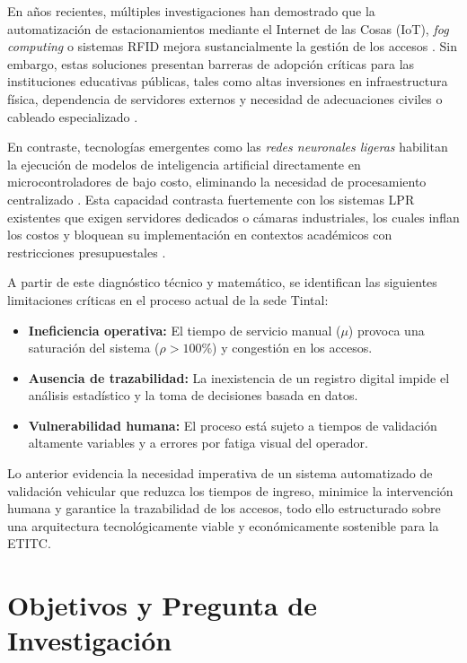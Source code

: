 \documentclass[12pt, letterpaper]{article}
\begin{document}
En años recientes, múltiples investigaciones han demostrado que la automatización de estacionamientos mediante el Internet de las Cosas (IoT), \textit{fog computing} o sistemas RFID mejora sustancialmente la gestión de los accesos \parencite{celaya2020fog, marshoodulla2024sdiotpark, olivares2011rfid}. Sin embargo, estas soluciones presentan barreras de adopción críticas para las instituciones educativas públicas, tales como altas inversiones en infraestructura física, dependencia de servidores externos y necesidad de adecuaciones civiles o cableado especializado \parencite{alam2023survey, valeo2020patentes}.

En contraste, tecnologías emergentes como las \textit{redes neuronales ligeras} habilitan la ejecución de modelos de inteligencia artificial directamente en microcontroladores de bajo costo, eliminando la necesidad de procesamiento centralizado \parencite{zheng2025iot}. Esta capacidad contrasta fuertemente con los sistemas LPR existentes que exigen servidores dedicados o cámaras industriales, los cuales inflan los costos y bloquean su implementación en contextos académicos con restricciones presupuestales \parencite{alam2023survey}.

A partir de este diagnóstico técnico y matemático, se identifican las siguientes limitaciones críticas en el proceso actual de la sede Tintal:

\begin{itemize}
    \item \textbf{Ineficiencia operativa:} El tiempo de servicio manual ($\mu$) provoca una saturación del sistema ($\rho > 100\%$) y congestión en los accesos.
    \item \textbf{Ausencia de trazabilidad:} La inexistencia de un registro digital impide el análisis estadístico y la toma de decisiones basada en datos.
    \item \textbf{Vulnerabilidad humana:} El proceso está sujeto a tiempos de validación altamente variables y a errores por fatiga visual del operador.
\end{itemize}

Lo anterior evidencia la necesidad imperativa de un sistema automatizado de validación vehicular que reduzca los tiempos de ingreso, minimice la intervención humana y garantice la trazabilidad de los accesos, todo ello estructurado sobre una arquitectura tecnológicamente viable y económicamente sostenible para la ETITC.

\section{Objetivos y Pregunta de Investigación}
\end{document}
